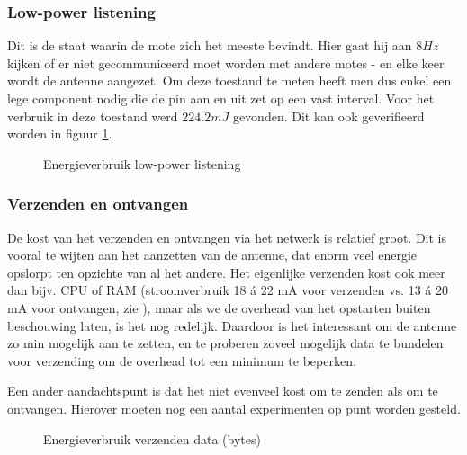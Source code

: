 \documentclass[11pt]{article}
\begin{document}
\subsubsection{Low-power listening}
Dit is de staat waarin de mote zich het meeste bevindt. Hier gaat hij aan $8Hz$
kijken of er niet gecommuniceerd moet worden met andere motes - en elke keer
wordt de antenne aangezet. Om deze toestand te meten heeft men dus enkel een
lege component nodig die de pin aan en uit zet op een vast interval. Voor het
verbruik in deze toestand werd $224.2mJ$ gevonden. Dit kan ook geverifieerd worden
in figuur \ref{fig:energieverbruik_lpl}.

\begin{figure}[h]
\centering

\caption{Energieverbruik low-power listening}
\label{fig:energieverbruik_lpl}
\end{figure}


\subsubsection{Verzenden en ontvangen}

De kost van het verzenden en ontvangen via het netwerk is relatief groot. Dit is
vooral te wijten aan het aanzetten van de antenne, dat enorm veel energie
opslorpt ten opzichte van al het andere. Het eigenlijke verzenden kost ook meer
dan bijv. CPU of RAM (stroomverbruik 18 \'a 22 mA voor verzenden vs. 13 \'a 20
mA voor ontvangen, zie \cite{atmega128rfa1}), maar als we de overhead van het opstarten buiten beschouwing
laten, is het nog redelijk. Daardoor is het interessant om de antenne zo min
mogelijk aan te zetten, en te proberen zoveel mogelijk data te bundelen voor
verzending om de overhead tot een minimum te beperken.


Een ander aandachtspunt is dat het niet evenveel kost om te zenden als om te
ontvangen. Hierover moeten nog een aantal experimenten op punt worden gesteld.

\begin{figure}[h]
\centering

\caption{Energieverbruik verzenden data (bytes)}
\label{fig:energieverbruik_ant}
\end{figure}
\end{document}
